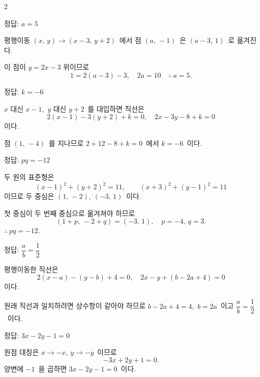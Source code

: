 \documentclass[10pt,fleqn]{article}
\begin{document}
\dmsoltitlefirsttrue
\begin{multicols*}{2}

\begin{dmanswerbox}
정답: $a=5$
\end{dmanswerbox}

평행이동 $(x,\, y) \to (x - 3,\, y + 2)$\ 에서 점 $(a,\, -1)$\ 은 $(a - 3,\, 1)$\ 로 옮겨진다.

이 점이 $y = 2x - 3$ 위이므로
\[ 1 = 2(a - 3) - 3,\quad 2a = 10 \quad\therefore\ a = 5. \]

\begin{dmanswerbox}
정답: $k=-6$
\end{dmanswerbox}

$x$ 대신 $x - 1$,\ $y$ 대신 $y + 2$\ 를 대입하면 직선은
\[ 2(x - 1) - 3(y + 2) + k = 0,\quad 2x - 3y - 8 + k = 0 \]
이다.

점 $(1,\, -4)$\ 를 지나므로 $2 + 12 - 8 + k = 0$\ 에서 $k = -6$\ 이다.

\begin{dmanswerbox}
정답: $pq=-12$
\end{dmanswerbox}

두 원의 표준형은
\[ (x - 1)^2 + (y + 2)^2 = 11,\qquad (x + 3)^2 + (y - 1)^2 = 11 \]
이므로 두 중심은 $(1,\, -2),\ (-3,\, 1)$\ 이다.

첫 중심이 두 번째 중심으로 옮겨져야 하므로
\[ (1 + p,\ -2 + q) = (-3,\, 1),\quad p = -4,\ q = 3. \]
$\therefore\ pq = -12$.

\begin{dmanswerbox}
정답: $\dfrac{a}{b}=\dfrac{1}{2}$
\end{dmanswerbox}

평행이동한 직선은
\[ 2(x - a) - (y - b) + 4 = 0,\quad 2x - y + (b - 2a + 4) = 0 \]
이다.

원래 직선과 일치하려면 상수항이 같아야 하므로 $b - 2a + 4 = 4$,\ $b = 2a$\ 이고 $\dfrac{a}{b} = \dfrac{1}{2}$\ 이다.
\begin{dmanswerbox}
정답: $3x-2y-1=0$
\end{dmanswerbox}

원점 대칭은 $x \to -x,\ y \to -y$\ 이므로
\[ -3x + 2y + 1 = 0. \]
양변에 $-1$\ 을 곱하면 $3x - 2y - 1 = 0$\ 이다.


\end{multicols*}
\end{document}
